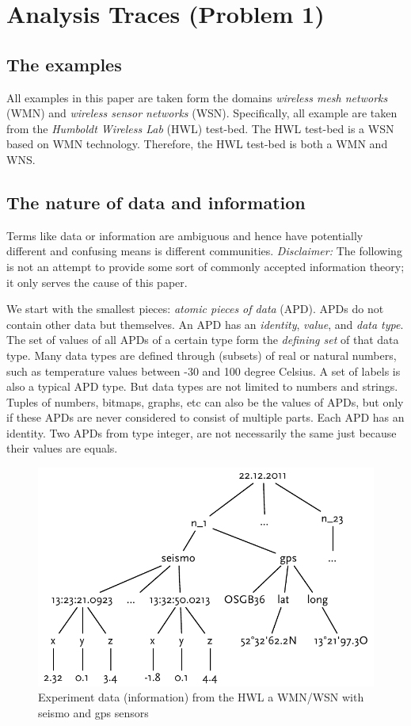 \section{Analysis Traces (Problem 1)}\label{sec:analysis_traces}

\subsection{The examples}

All examples in this paper are taken form the domains \emph{wireless mesh networks} (WMN) and \emph{wireless sensor networks} (WSN). Specifically, all example are taken from the \emph{Humboldt Wireless Lab} (HWL) test-bed. The HWL test-bed is a WSN based on WMN technology. Therefore, the HWL test-bed is both a WMN and WNS.

\subsection{The nature of data and information}\label{sec:information}

Terms like data or information are ambiguous and hence have potentially different and confusing means is different communities. \emph{Disclaimer:} The following is not an attempt to provide some sort of commonly accepted information theory; it only serves the cause of this paper.

We start with the smallest pieces: \emph{atomic pieces of data} (APD). APDs do not contain other data but themselves. An APD has an \emph{identity}, \emph{value}, and \emph{data type}. The set of values of all APDs of a certain type form the \emph{defining set} of that data type. Many data types are defined through (subsets) of real or natural numbers, such as temperature values between -30 and 100 degree Celsius. A set of labels is also a typical APD type. But data types are not limited to numbers and strings. Tuples of numbers, bitmaps, graphs, etc can also be the values of APDs, but only if these APDs are never considered to consist of multiple parts. Each APD has an identity. Two APDs from type integer, are not necessarily the same just because their values are equals.

\begin{figure}
  \centering
  \includegraphics[width=0.65\linewidth]{figures/example_information_graph}
  \caption{Experiment data (information) from the HWL a WMN/WSN with seismo and gps sensors}
  \label{fig:example_information_graph}
\end{figure}

